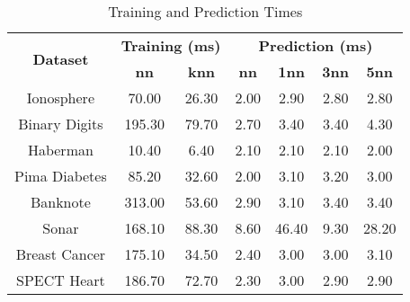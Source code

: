 \begin{table}[htbp]
\caption{Training and Prediction Times}
\begin{center}
\begin{tabular}{|c|c|c|c|c|c|c|}
\hline
\multirow{2}{*}{\textbf{Dataset}} & \multicolumn{2}{c|}{\textbf{Training (ms)}} & \multicolumn{4}{c|}{\textbf{Prediction (ms)}} \\ \cline{2-7}
 & \textbf{nn} & \textbf{knn} & \textbf{nn} & \textbf{1nn} & \textbf{3nn} & \textbf{5nn} \\ \hline
Ionosphere & 70.00 & 26.30 & 2.00 & 2.90 & 2.80 & 2.80 \\ \hline
Binary Digits & 195.30 & 79.70 & 2.70 & 3.40 & 3.40 & 4.30 \\ \hline
Haberman & 10.40 & 6.40 & 2.10 & 2.10 & 2.10 & 2.00 \\ \hline
Pima Diabetes & 85.20 & 32.60 & 2.00 & 3.10 & 3.20 & 3.00 \\ \hline
Banknote & 313.00 & 53.60 & 2.90 & 3.10 & 3.40 & 3.40 \\ \hline
Sonar & 168.10 & 88.30 & 8.60 & 46.40 & 9.30 & 28.20 \\ \hline
Breast Cancer & 175.10 & 34.50 & 2.40 & 3.00 & 3.00 & 3.10 \\ \hline
SPECT Heart & 186.70 & 72.70 & 2.30 & 3.00 & 2.90 & 2.90 \\ \hline
\end{tabular}
\label{tab:timing}
\end{center}
\end{table}